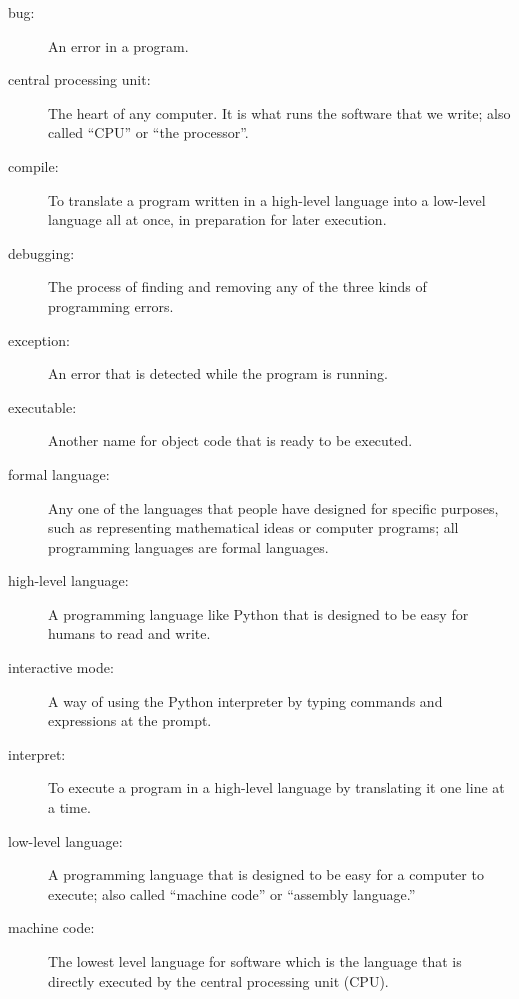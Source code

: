 \documentclass[10pt]{book}
\begin{document}
\begin{description}

\item[bug:]  An error in a program.

\item[central processing unit:] The heart of any computer.  It is what
runs the software that we write; also called ``CPU'' or ``the processor''.

\item[compile:]  To translate a program written in a high-level language
into a low-level language all at once, in preparation for later
execution.

\item[debugging:]  The process of finding and removing any of the
three kinds of programming errors.

\item[exception:]  An error that is detected while the program is running.

\item[executable:]  Another name for object code that is ready
to be executed.

\item[formal language:]  Any one of the languages that people have designed
for specific purposes, such as representing mathematical ideas or
computer programs; all programming languages are formal languages.

\item[high-level language:]  A programming language like Python that
is designed to be easy for humans to read and write.

\item[interactive mode:] A way of using the Python interpreter by
typing commands and expressions at the prompt.

\item[interpret:]  To execute a program in a high-level language
by translating it one line at a time.

\item[low-level language:]  A programming language that is designed
to be easy for a computer to execute; also called ``machine code'' or
``assembly language.''

\item[machine code:]  The lowest level language for software which 
is the language that is directly executed by the central processing unit 
(CPU).


\end{description}
\end{document}
